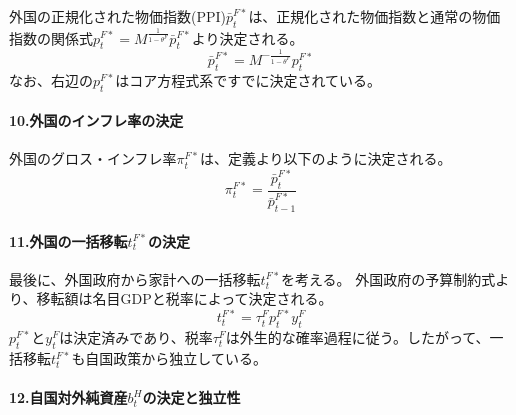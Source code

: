 外国の正規化された物価指数(PPI)\(\bar{p}_t^{F*}\)は、正規化された物価指数と通常の物価指数の関係式\(p_t^{F*}=M^{\frac{1}{1-\theta^F}}\bar{p}_t^{F*}\)より決定される。
\begin{equation}
    \bar{p}_t^{F*}=M^{-\frac{1}{1-\theta^F}}p_t^{F*}
    \label{eq:appendix_insulation_effect_other_ppi_final}
\end{equation}
なお、右辺の\(p_t^{F*}\)はコア方程式系ですでに決定されている。

\paragraph{10.外国のインフレ率の決定}
\label{sec:appendix_insulation_effect_other_inflation}

外国のグロス・インフレ率\(\pi_t^{F*}\)は、定義より以下のように決定される。
\begin{equation}
\pi_t^{F*}=\frac{\bar{p}_t^{F*}}{\bar{p}_{t-1}^{F*}}
\label{eq:appendix_insulation_effect_other_inflation_def}
\end{equation}

\paragraph{11.外国の一括移転\(t_t^{F*}\)の決定}
\label{sec:appendix_insulation_effect_other_transfer}

最後に、外国政府から家計への一括移転\(t_t^{F*}\)を考える。
外国政府の予算制約式より、移転額は名目GDPと税率によって決定される。
\begin{equation}
    t_t^{F*}=\tau_t^Fp_t^{F*}y_t^F
    \label{eq:appendix_insulation_effect_other_transfer_final}
\end{equation}
\(p_t^{F*}\)と\(y_t^F\)は決定済みであり、税率\(\tau_t^F\)は外生的な確率過程に従う。したがって、一括移転\(t_t^{F*}\)も自国政策から独立している。

\paragraph{12.自国対外純資産\(b_t^H\)の決定と独立性}
\label{sec:appendix_insulation_effect_other_nfa}

